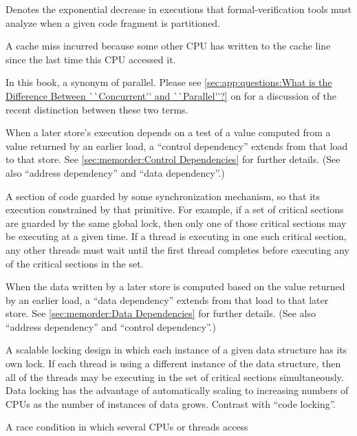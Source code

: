 \begin{description}
	Denotes the exponential decrease in executions that
	formal-verification tools must analyze when a given
	code fragment is partitioned.
\item[\IXGalth{Communication Miss}{communication}{cache miss}:]
	A cache miss incurred because some other CPU has written to
	the cache line since the last time this CPU accessed it.
\item[\IXG{Concurrent}:]
	In this book, a synonym of parallel.
	Please see \cref{sec:app:questions:What is the Difference Between ``Concurrent'' and ``Parallel''?}
	on 
	for a discussion of the recent distinction between these two
	terms.
\item[\IXGh{Control}{Dependency}:]
	When a later store's execution depends on a test of a value
	computed from a value returned by an earlier load,
	a ``control dependency'' extends from that load to that store.
	See \cref{sec:memorder:Control Dependencies} for further details.
	(See also ``address dependency'' and ``data dependency''.)
\item[\IXG{Critical Section}:]
	A section of code guarded by some synchronization mechanism,
	so that its execution constrained by that primitive.
	For example, if a set of critical sections are guarded by
	the same global lock, then only one of those critical sections
	may be executing at a given time.
	If a thread is executing in one such critical section,
	any other threads must wait until the first thread completes
	before executing any of the critical sections in the set.
\item[\IXGh{Data}{Dependency}:]
	When the data written by a later store is computed based
	on the value returned by an earlier load, a ``data dependency''
	extends from that load to that later store.
	See \cref{sec:memorder:Data Dependencies} for further details.
	(See also ``address dependency'' and ``control dependency''.)
\item[\IXGh{Data}{Locking}:]
	A scalable locking design in which each instance of a given
	data structure has its own lock.
	If each thread is using a different instance of the
	data structure, then all of the threads may be executing in
	the set of critical sections simultaneously.
	Data locking has the advantage of automatically scaling to
	increasing numbers of CPUs as the number of instances of
	data grows.
	Contrast with ``code locking''.
\item[\IXG{Data Race}:]
	A race condition in which several CPUs or threads access

\end{description}
